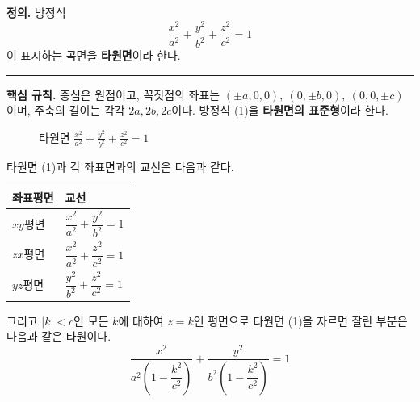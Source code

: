\documentclass{article}
\theoremstyle{mystyle}
\begin{document}
\begin{tcolorbox}[
    colback=teal!4,
    colframe=teal!65!black,
    title=정의 \& 핵심 규칙,
    fonttitle=\bfseries,
    boxrule=0.5mm,
    arc=3mm
    ]
    \textbf{\textcolor{teal!65!black}{정의.}}\quad
    방정식
    \[
    \frac{x^2}{a^2}+\frac{y^2}{b^2}+\frac{z^2}{c^2}=1 \tag{1}
    \]
    이 표시하는 곡면을 \textbf{타원면}이라 한다.

    \noindent\textcolor{teal!50!black}{\rule{\linewidth}{0.4pt}}

    \textbf{\textcolor{teal!65!black}{핵심 규칙.}}\quad
    중심은 원점이고, 꼭짓점의 좌표는 \((\pm a,0,0),\ (0,\pm b,0),\ (0,0,\pm c)\)이며, 주축의 길이는 각각 \(2a,2b,2c\)이다. 방정식 (1)을 \textbf{타원면의 표준형}이라 한다.
\end{tcolorbox}
\begin{figure}[h]
\centering
{}
\caption{타원면 $\frac{x^2}{a^2}+\frac{y^2}{b^2}+\frac{z^2}{c^2}=1$}
\end{figure}

타원면 (1)과 각 좌표면과의 교선은 다음과 같다.

\begin{center}
\renewcommand{\arraystretch}{1.4}
\begin{tabular}{|l|l|}
\hline
좌표평면 & 교선 \\
\hline
\(xy\)평면 & \(\dfrac{x^2}{a^2}+\dfrac{y^2}{b^2}=1\) \\
\hline
\(zx\)평면 & \(\dfrac{x^2}{a^2}+\dfrac{z^2}{c^2}=1\) \\
\hline
\(yz\)평면 & \(\dfrac{y^2}{b^2}+\dfrac{z^2}{c^2}=1\) \\
\hline
\end{tabular}
\end{center}

그리고 \(|k|<c\)인 모든 \(k\)에 대하여 \(z=k\)인 평면으로 타원면 (1)을 자르면 잘린 부분은 다음과 같은 타원이다.
\[
\frac{x^2}{a^2\left(1-\dfrac{k^2}{c^2}\right)}+\frac{y^2}{b^2\left(1-\dfrac{k^2}{c^2}\right)}=1
\]
\end{document}
